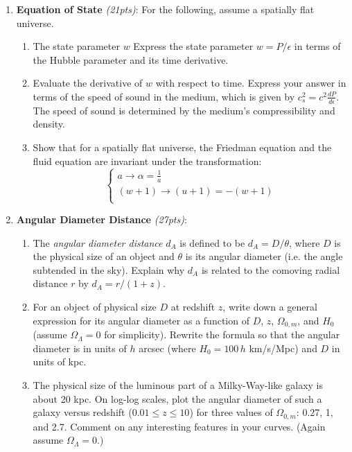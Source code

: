 \documentclass[12pt,preprint]{aastex}
\begin{document}
\begin{enumerate}
\item \textbf{Equation of State} \textit{(21pts)}: 
    For the following, assume a spatially flat universe.
	\begin{enumerate}
	\item The state parameter $w$ Express the state parameter $w=P/\epsilon$ in terms of the Hubble parameter and its time derivative.
	\item Evaluate the derivative of $w$ with respect to time. Express your answer in terms of the speed of sound in the medium, which is given by $c_s^2 = c^2 \frac{dP}{d\epsilon}$. The speed of sound is determined by the medium's compressibility and density. 
	\item Show that for a spatially flat universe, the Friedman equation and the fluid equation are invariant under the transformation:
	$$\begin{cases}
	a \rightarrow \alpha = \frac{1}{a} \\ 
	(w+1) \rightarrow (u + 1) = -(w+1) \\
	\end{cases}$$
	\end{enumerate}

\item \textbf{Angular Diameter Distance} \textit{(27pts)}: 
	\begin{enumerate} 
	\item The {\it angular diameter distance} $d_A$ is defined to be $d_A=D/\theta$, where $D$ is the physical size of an object and $\theta$ is its angular diameter (i.e. the angle subtended in the sky).  Explain why $d_A$ is related to the comoving radial distance $r$ by $ d_A = r/(1+z)$.
	\item For an object of physical size $D$ at redshift $z$, write down a general expression for its angular diameter as a function of $D$, $z$, $\Omega_{0,m}$, and $H_0$ (assume $\Omega_\Lambda=0$ for simplicity). Rewrite the formula so that the angular diameter is in units of $h$ arcsec (where $H_0=100\,h$ km/s/Mpc) and $D$ in units of kpc.
	\item The physical size of the luminous part of a Milky-Way-like galaxy is about 20 kpc.  On log-log scales, plot the angular diameter of such a galaxy versus redshift ($0.01 \le z \le 10$) for three values of $\Omega_{0,m}$: 0.27, 1, and 2.7.  Comment on any interesting features in your curves.  (Again assume $\Omega_\Lambda=0$.)
	\end{enumerate}



\end{enumerate}
\end{document}
